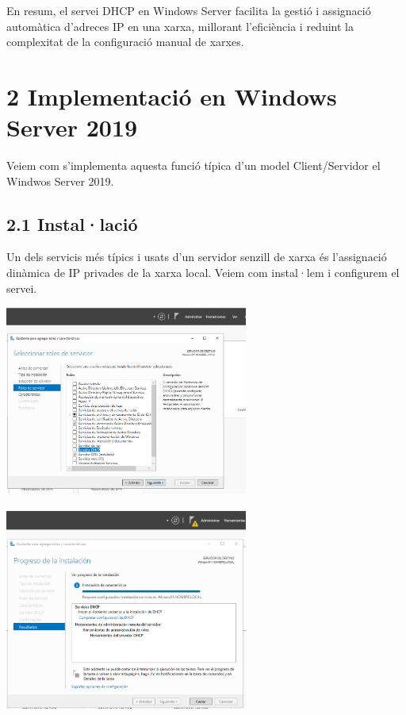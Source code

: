 \documentclass[
  a4paper,
]{article}
\begin{document}
En resum, el servei DHCP en Windows Server facilita la gestió i
assignació automàtica d'adreces IP en una xarxa, millorant l'eficiència
i reduint la complexitat de la configuració manual de xarxes.

\section{2 Implementació en Windows Server
2019}\label{implementaciuxf3-en-windows-server-2019}

Veiem com s'implementa aquesta funció típica d'un model Client/Servidor
el Windwos Server 2019.

\subsection{2.1 Instal·lació}\label{installaciuxf3}

Un dels servicis més típics i usats d'un servidor senzill de xarxa és
l'assignació dinàmica de IP privades de la xarxa local. Veiem com
instal·lem i configurem el servei.

\includegraphics[width=0.6\textwidth,height=\textheight]{png/DHCP1.png}

\includegraphics[width=0.6\textwidth,height=\textheight]{png/DHCP2.png}
\end{document}
